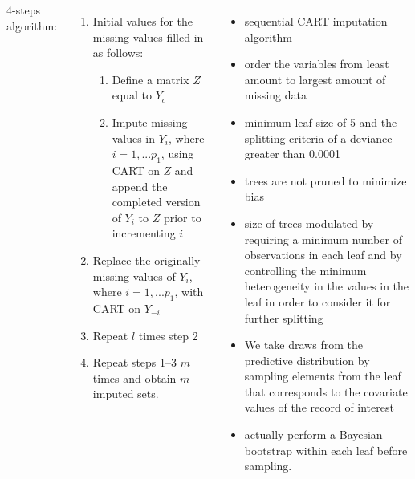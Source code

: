 \documentclass[20pt,margin=1in,innermargin=-4.5in,blockverticalspace=-0.25in]{tikzposter}
\begin{document}
\begin{columns}
{        4-steps algorithm:
        \begin{enumerate}
            \item Initial values for the missing values filled in as follows:
            \begin{enumerate}
                \item Define a matrix $Z$ equal to $Y_c$
                \item Impute missing values in $Y_i$, where $i=1, ... p_1$, using CART on $Z$ and append the completed version of $Y_i$ to $Z$ prior to incrementing $i$             
            \end{enumerate}       
            \item  Replace the originally missing values of $Y_i$, where $i=1, ... p_1$, with CART on $Y_{-i}$
            \item Repeat $l$ times step 2
            \item Repeat steps 1–3 $m$ times and obtain $m$ imputed sets.
        \end{enumerate}   


        \vspace{10mm}

        \begin{itemize}
            \item sequential CART imputation algorithm
            \item  order the variables from least amount to largest amount of missing data
            \item minimum leaf size of 5 and the splitting criteria of a deviance greater than 0.0001
            \item trees are not pruned to minimize bias
            \item size of trees modulated by requiring a minimum number of observations in each leaf and by controlling the minimum heterogeneity in the values in the leaf in order to consider it for further splitting     
            \item We take draws from the predictive distribution by sampling elements from the leaf that corresponds to the covariate values of the record of interest
            \item  actually perform a Bayesian bootstrap within each leaf before sampling.
        \end{itemize}
    }

    
\end{columns}
\end{document}
